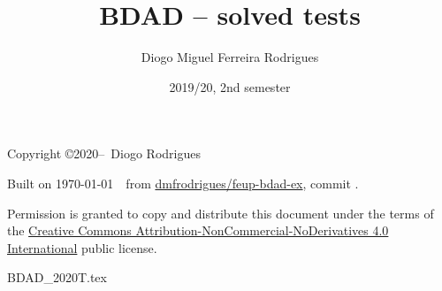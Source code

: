 \documentclass{bdad}
\title{BDAD -- solved tests}
\author{Diogo Miguel Ferreira Rodrigues  \\ \email{dmfrodrigues2000@gmail.com}}
\date{2019/20, 2nd semester}
\begin{document}
\maketitle
\begin{secondpage}
    Copyright \copyright 2020--\the\year\ Diogo Rodrigues\par
    \par
    \immediate{}
    Built on \today~\currenttime~from \href{https://github.com/dmfrodrigues/feup-bdad-ex}{dmfrodrigues/feup-bdad-ex}, commit \unskip.\par
    Permission is granted to copy and distribute this document under the terms of the
    \href{https://creativecommons.org/licenses/by-nc-nd/4.0/}{Creative Commons Attribution-NonCommercial-NoDerivatives 4.0 International}
    public license.
\end{secondpage}
\frontmatter
\tableofcontents
\mainmatter
{BDAD_2020T.tex}
\end{document}
